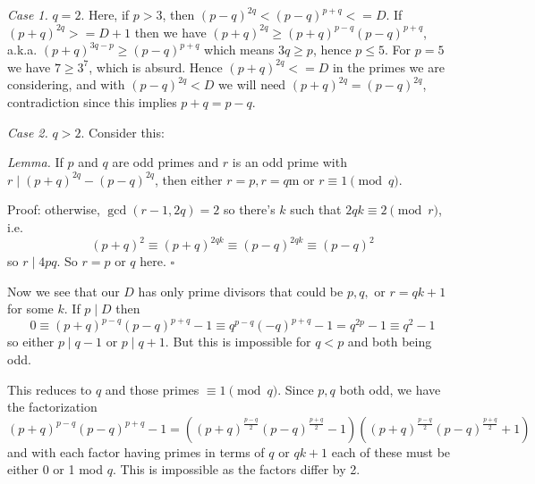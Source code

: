 \documentclass[11pt,a4paper]{article}
\begin{document}
\begin{enumerate}
    \emph{Case 1.} $q=2$. 
    Here, if $p>3$, then $(p-q)^{2q} < (p-q)^{p+q} <= D$. If $(p+q)^{2q}>=D+1$ then we have $(p+q)^{2q}\ge (p+q)^{p-q}(p-q)^{p+q}$, a.k.a. $(p+q)^{3q-p}\ge (p-q)^{p+q}$ which means $3q\ge p$, hence $p\le 5$. For $p=5$ we have $7\ge 3^{7}$, which is absurd. Hence $(p+q)^{2q} <= D$ in the primes we are considering, and with $(p-q)^{2q}<D$ we will need $(p+q)^{2q}=(p-q)^{2q}$, contradiction since this implies $p+q=p-q$. 
    
    \emph{Case 2.} $q>2$. 
    Consider this: 
    
    \emph{Lemma.} If $p$ and $q$ are odd primes and $r$ is an odd prime with $r\mid (p+q)^{2q}-(p-q)^{2q}$, then either $r=p, r=q$m or $r\equiv 1\pmod{q}$. 
    
    Proof: otherwise, $\gcd(r-1, 2q)=2$ so there's $k$ such that $2qk\equiv 2\pmod{r}$, i.e. 
    \[
    (p+q)^2\equiv (p+q)^{2qk}\equiv  (p-q)^{2qk}\equiv (p-q)^2
    \]
    so $r\mid 4pq$. So $r=p$ or $q$ here. $\square$ 
    
    Now we see that our $D$ has only prime divisors that could be $p, q,$ or $r=qk+1$ for some $k$. 
    If $p\mid D$ then 
    \[
    0\equiv (p+q)^{p-q}(p-q)^{p+q}-1
    \equiv q^{p-q}(-q)^{p+q}-1
    =q^{2p}-1\equiv q^2-1
    \]
    so either $p\mid q-1$ or $p\mid q+1$. But this is impossible for $q<p$ and both being odd. 
    
    This reduces to $q$ and those primes $\equiv 1\pmod{q}$. 
    Since $p, q$ both odd, we have the factorization 
    \[
    (p+q)^{p-q}(p-q)^{p+q}-1
    =((p+q)^{\frac{p-q}{2}}(p-q)^{\frac{p+q}{2}}-1)((p+q)^{\frac{p-q}{2}}(p-q)^{\frac{p+q}{2}}+1)
    \]
    and with each factor having primes in terms of $q$ or $qk+1$ each of these must be either 0 or 1 mod $q$. 
    This is impossible as the factors differ by 2. 
	\end{enumerate}
\end{document}
